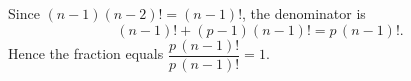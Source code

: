 Since $(n-1)(n-2)!=(n-1)!$, the denominator is
\[(n-1)!+(p-1)(n-1)!=p\,(n-1)!.\]
Hence the fraction equals $\dfrac{p\,(n-1)!}{p\,(n-1)!}=\boxed{1}$.
